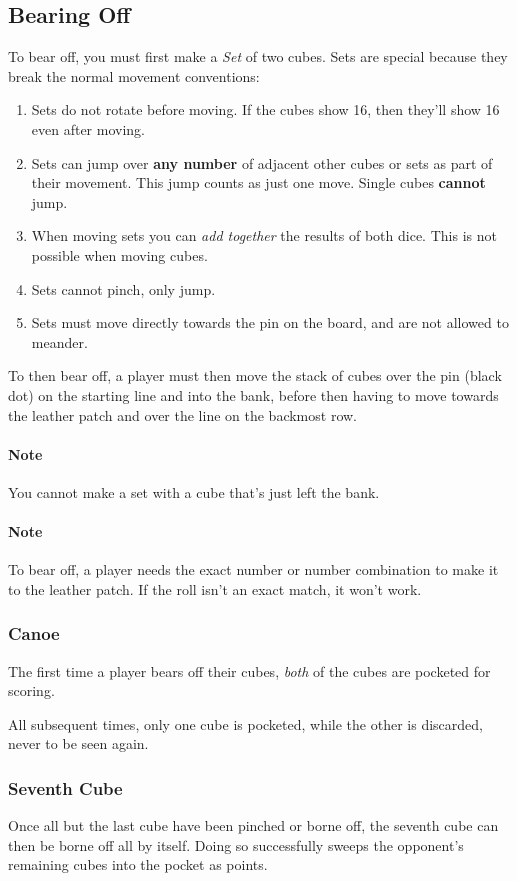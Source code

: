 \documentclass[a4paper]{article}
\begin{document}
\subsection{Bearing Off}
To bear off, you must first make a \textit{Set} of two cubes.
Sets are special because they break the normal movement conventions:
\begin{enumerate}
    \item Sets do not rotate before moving. If the cubes show 16, then they'll show 16 even after moving.
    \item Sets can jump over \textbf{any number} of adjacent other cubes or sets as part of their movement. This jump counts as just one move. Single cubes \textbf{cannot} jump.
    \item When moving sets you can \textit{add together} the results of both dice. This is not possible when moving cubes.
    \item Sets cannot pinch, only jump.
    \item Sets must move directly towards the pin on the board, and are not allowed to meander.
\end{enumerate}
To then bear off, a player must then move the stack of cubes over the pin (black dot) on the starting line and into the bank, before then having to move towards the leather patch and over the line on the backmost row.

\paragraph{Note} You cannot make a set with a cube that's just left the bank.

\paragraph{Note} To bear off, a player needs the exact number or number combination to make it to the leather patch. If the roll isn't an exact match, it won't work.

\subsubsection{Canoe}
The first time a player bears off their cubes, \textit{both} of the cubes are pocketed for scoring.

All subsequent times, only one cube is pocketed, while the other is discarded, never to be seen again.

\subsubsection{Seventh Cube}
Once all but the last cube have been pinched or borne off, the seventh cube can then be borne off all by itself.
Doing so successfully sweeps the opponent's remaining cubes into the pocket as points.
\end{document}
